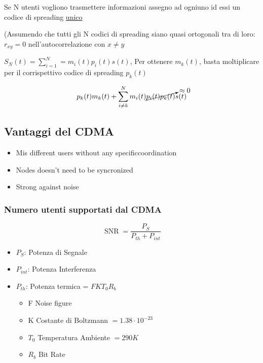 \documentclass{article}
\DeclareMathOperator\snr{SNR}
\begin{document}
Se N utenti vogliono trasmettere informazioni assegno ad ogniuno id essi un codice di spreading \underline{unico}

(Assumendo che tutti gli N codici di spreading siano quasi ortogonali tra di loro: $r_{xy} = 0$ nell'autocorrelazione con $x \ne y$

\( S_N(t) = \sum^N_{i=1} = m_i(t)p_i(t)s(t)\), Per ottenere $m_k(t)$, basta moltiplicare per il corrispettivo codice di spreading $p_k(t)$

\[ p_k(t) m_k(t) + \sum^N_{i \neq k} m_i(t)\cancelto{\approx 0}{p_i(t)p_k(t)}s(t) \]

\subsection{Vantaggi del CDMA}
\begin{itemize}
    \item Mis different users without any specificcoordination
    \item Nodes doesn't need to be syncronized
    \item Strong against noise
\end{itemize}
\subsubsection{Numero utenti supportati dal CDMA}
\begin{minipage}{0.5\textwidth}
    \[ \snr = \frac{P_S}{P_{th} + P_{int}} \]
\end{minipage}
\begin{minipage}{0.5\textwidth}
    \begin{itemize}
        \item $P_S$: Potenza di Segnale
        \item $P_{int}$: Potenza Interferenza
        \item $P_{th}$: Potenza termica = $FKT_0R_b$
            \begin{itemize}
                \item F Noise figure
                \item K Costante di Boltzmann $= 1.38 \cdot 10^{-23}$
                \item $T_0$ Temperatura Ambiente $= 290K$
                \item $R_b$ Bit Rate
            \end{itemize}
    \end{itemize}
\end{minipage}
\end{document}
